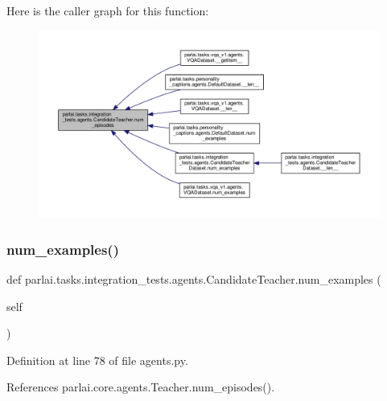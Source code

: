 Here is the caller graph for this function\+:
\nopagebreak
\begin{figure}[H]
\begin{center}
\leavevmode
\includegraphics[width=350pt]{classparlai_1_1tasks_1_1integration__tests_1_1agents_1_1CandidateTeacher_a4bc06e52e0a67e05924717ac04075d88_icgraph}
\end{center}
\end{figure}
\mbox{\label{classparlai_1_1tasks_1_1integration__tests_1_1agents_1_1CandidateTeacher_a8dec3a8ce8311214b44c936f0805e13a}} 
\subsubsection{\texorpdfstring{num\+\_\+examples()}{num\_examples()}}
{\footnotesize\ttfamily def parlai.\+tasks.\+integration\+\_\+tests.\+agents.\+Candidate\+Teacher.\+num\+\_\+examples (\begin{DoxyParamCaption}\item[{}]{self }\end{DoxyParamCaption})}



Definition at line 78 of file agents.\+py.



References parlai.\+core.\+agents.\+Teacher.\+num\+\_\+episodes().



